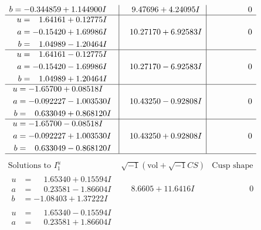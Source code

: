 \documentclass[1p]{elsarticle_modified}
\theoremstyle{definition}
\newcommand{\I}{\sqrt{-1}}
\begin{document}
$$\begin{array}{c|c|c}
\begin{aligned}
b &= -0.344859 + 1.144900 I\end{aligned}
 & \phantom{-}9.47696 + 4.24095 I & \phantom{-0.000000 } 0 \\ \hline\begin{aligned}
u &= \phantom{-}1.64161 + 0.12775 I \\
a &= -0.15420 + 1.69986 I \\
b &= \phantom{-}1.04989 - 1.20464 I\end{aligned}
 & \phantom{-}10.27170 + 6.92583 I & \phantom{-0.000000 } 0 \\ \hline\begin{aligned}
u &= \phantom{-}1.64161 - 0.12775 I \\
a &= -0.15420 - 1.69986 I \\
b &= \phantom{-}1.04989 + 1.20464 I\end{aligned}
 & \phantom{-}10.27170 - 6.92583 I & \phantom{-0.000000 } 0 \\ \hline\begin{aligned}
u &= -1.65700 + 0.08518 I \\
a &= -0.092227 - 1.003530 I \\
b &= \phantom{-}0.633049 + 0.868120 I\end{aligned}
 & \phantom{-}10.43250 - 0.92808 I & \phantom{-0.000000 } 0 \\ \hline\begin{aligned}
u &= -1.65700 - 0.08518 I \\
a &= -0.092227 + 1.003530 I \\
b &= \phantom{-}0.633049 - 0.868120 I\end{aligned}
 & \phantom{-}10.43250 + 0.92808 I & \phantom{-0.000000 } 0\\
 \hline 
 \end{array}$$\newpage$$\begin{array}{c|c|c}  
\text{Solutions to }I^u_{1}& \I (\text{vol} + \sqrt{-1}CS) & \text{Cusp shape}\\
 \hline 
\begin{aligned}
u &= \phantom{-}1.65340 + 0.15594 I \\
a &= \phantom{-}0.23581 - 1.86604 I \\
b &= -1.08403 + 1.37222 I\end{aligned}
 & \phantom{-}8.6605 + 11.6416 I & \phantom{-0.000000 } 0 \\ \hline\begin{aligned}
u &= \phantom{-}1.65340 - 0.15594 I \\
a &= \phantom{-}0.23581 + 1.86604 I \\

\end{aligned}
\end{array}$$
\end{document}

